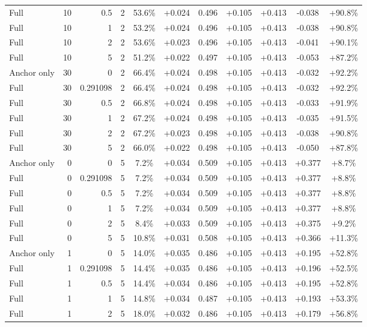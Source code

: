 \begin{table}[htbp]
\begin{tabular}{lrrrccccccc}
Full & 10 & 0.5 & 2 & 53.6\% & +0.024 & 0.496 & +0.105 & +0.413 & -0.038 & +90.8\% \\
Full & 10 & 1 & 2 & 53.2\% & +0.024 & 0.496 & +0.105 & +0.413 & -0.038 & +90.8\% \\
Full & 10 & 2 & 2 & 53.6\% & +0.023 & 0.496 & +0.105 & +0.413 & -0.041 & +90.1\% \\
Full & 10 & 5 & 2 & 51.2\% & +0.022 & 0.497 & +0.105 & +0.413 & -0.053 & +87.2\% \\
Anchor only & 30 & 0 & 2 & 66.4\% & +0.024 & 0.498 & +0.105 & +0.413 & -0.032 & +92.2\% \\
Full & 30 & 0.291098 & 2 & 66.4\% & +0.024 & 0.498 & +0.105 & +0.413 & -0.032 & +92.2\% \\
Full & 30 & 0.5 & 2 & 66.8\% & +0.024 & 0.498 & +0.105 & +0.413 & -0.033 & +91.9\% \\
Full & 30 & 1 & 2 & 67.2\% & +0.024 & 0.498 & +0.105 & +0.413 & -0.035 & +91.5\% \\
Full & 30 & 2 & 2 & 67.2\% & +0.023 & 0.498 & +0.105 & +0.413 & -0.038 & +90.8\% \\
Full & 30 & 5 & 2 & 66.0\% & +0.022 & 0.498 & +0.105 & +0.413 & -0.050 & +87.8\% \\
Anchor only & 0 & 0 & 5 & 7.2\% & +0.034 & 0.509 & +0.105 & +0.413 & +0.377 & +8.7\% \\
Full & 0 & 0.291098 & 5 & 7.2\% & +0.034 & 0.509 & +0.105 & +0.413 & +0.377 & +8.8\% \\
Full & 0 & 0.5 & 5 & 7.2\% & +0.034 & 0.509 & +0.105 & +0.413 & +0.377 & +8.8\% \\
Full & 0 & 1 & 5 & 7.2\% & +0.034 & 0.509 & +0.105 & +0.413 & +0.377 & +8.8\% \\
Full & 0 & 2 & 5 & 8.4\% & +0.033 & 0.509 & +0.105 & +0.413 & +0.375 & +9.2\% \\
Full & 0 & 5 & 5 & 10.8\% & +0.031 & 0.508 & +0.105 & +0.413 & +0.366 & +11.3\% \\
Anchor only & 1 & 0 & 5 & 14.0\% & +0.035 & 0.486 & +0.105 & +0.413 & +0.195 & +52.8\% \\
Full & 1 & 0.291098 & 5 & 14.4\% & +0.035 & 0.486 & +0.105 & +0.413 & +0.196 & +52.5\% \\
Full & 1 & 0.5 & 5 & 14.4\% & +0.034 & 0.486 & +0.105 & +0.413 & +0.195 & +52.8\% \\
Full & 1 & 1 & 5 & 14.8\% & +0.034 & 0.487 & +0.105 & +0.413 & +0.193 & +53.3\% \\
Full & 1 & 2 & 5 & 18.0\% & +0.032 & 0.486 & +0.105 & +0.413 & +0.179 & +56.8\% \\

\end{tabular}
\end{table}
